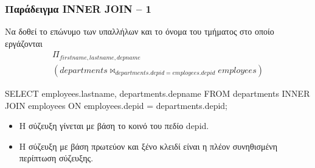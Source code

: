 \begin{frame}
\frametitle{Παράδειγμα  {\en INNER JOIN} -- 1}
\vspace*{-0.5cm}
\begin{minipage}{\wE}
\begin{exampleblock}{\small Να δοθεί το επώνυμο των υπαλλήλων και το όνομα του τμήματος στο
              οποίο εργάζονται}
\en
\[
\begin{split}
  \Pi_{firstname, lastname, depname} \\ ( departments \bowtie_{departments.depid=employees.depid} employees)
\end{split}
\]
\pause
\vspace*{-0.5cm}
\en
\begin{SQL}
  SELECT employees.lastname, departments.depname
    FROM departments INNER JOIN employees
         ON employees.depid = departments.depid;
\end{SQL}
\end{exampleblock}
\el
\begin{itemize}
  \item Η σύζευξη γίνεται με βάση το κοινό του πεδίο {\ra depid}.
  \item Η σύζευξη με βάση {\crr πρωτεύον} και {\crr ξένο} κλειδί  
        είναι η πλέον συνηθισμένη περίπτωση σύζευξης.
\end{itemize}
\end{minipage}
\end{frame}




